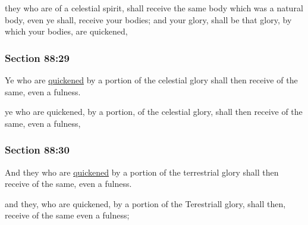 		\begin{framed}
		\scriptsize
			\begin{compactdesc}
				\item[JSP] they who are of a celestial spirit, shall receive the same body which was a natural body, even ye shall, receive your bodies; and your glory, shall be that glory, by which your bodies, are quickened,
			\end{compactdesc}
		\end{framed}

	\subsubsection{Section 88:29} %
		\label{DC88-29}

		Ye who are \hyperref[QUICKEN]{quickened} by a portion of the celestial glory shall then receive of the same, even a fulness.

		\begin{framed}
		\scriptsize
			\begin{compactdesc}
				\item[JSP] ye who are quickened, by a portion, of the celestial glory, shall then receive of the same, even a fulness,
			\end{compactdesc}
		\end{framed}

	\subsubsection{Section 88:30} %
		\label{DC88-30}

		And they who are \hyperref[QUICKEN]{quickened} by a portion of the terrestrial glory shall then receive of the same, even a fulness.

		\begin{framed}
		\scriptsize
			\begin{compactdesc}
				\item[JSP] and they, who are quickened, by a portion of the Terestriall glory, shall then, receive of the same even a fulness;
			\end{compactdesc}
		\end{framed}

